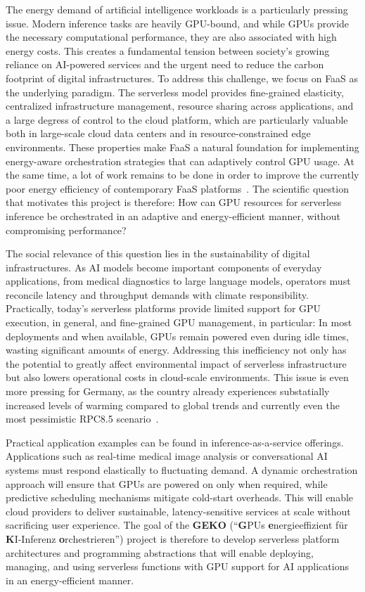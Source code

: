 The energy demand of artificial intelligence workloads is a particularly pressing issue.
Modern inference tasks are heavily GPU-bound, and while GPUs provide the necessary computational performance, they are also associated with high energy costs.
This creates a fundamental tension between society's growing reliance on AI-powered services and the urgent need to reduce the carbon footprint of digital infrastructures.
To address this challenge, we focus on FaaS as the underlying paradigm.
The serverless model provides fine-grained elasticity, centralized infrastructure management, resource sharing across applications, and a large degress of control to the cloud platform, which are particularly valuable both in large-scale cloud data centers and in resource-constrained edge environments.
These properties make FaaS a natural foundation for implementing energy-aware orchestration strategies that can adaptively control GPU usage.
At the same time, a lot of work remains to be done in order to improve the currently poor energy efficiency of contemporary FaaS platforms~\cite{sharma_challenges_2023}.
The scientific question that motivates this project is therefore: How can GPU resources for serverless inference be orchestrated in an adaptive and energy-efficient manner, without compromising performance?

The social relevance of this question lies in the sustainability of digital infrastructures.
As AI models become important components of everyday applications, from medical diagnostics to large language models, operators must reconcile latency and throughput demands with climate responsibility.
Practically, today's serverless platforms provide limited support for GPU execution, in general, and fine-grained GPU management, in particular: In most deployments and when available, GPUs remain powered even during idle times, wasting significant amounts of energy.
Addressing this inefficiency not only has the potential to greatly affect environmental impact of serverless infrastructure but also lowers operational costs in cloud-scale environments.
This issue is even more pressing for Germany, as the country already experiences substatially increased levels of warming compared to global trends and currently even the most pessimistic RPC8.5 scenario~\cite{dwd_2024_klimastatusbericht}.

Practical application examples can be found in inference-as-a-service offerings.
Applications such as real-time medical image analysis or conversational AI systems must respond elastically to fluctuating demand.
A dynamic orchestration approach will ensure that GPUs are powered on only when required, while predictive scheduling mechanisms mitigate cold-start overheads.
This will enable cloud providers to deliver sustainable, latency-sensitive services at scale without sacrificing user experience.
The goal of the \textbf{GEKO} (\enquote{\textbf{G}PUs \textbf{e}nergieeffizient für \textbf{K}I-Inferenz \textbf{o}rchestrieren}) project is therefore to develop serverless platform architectures and programming abstractions that will enable deploying, managing, and using serverless functions with GPU support for AI applications in an energy-efficient manner.

